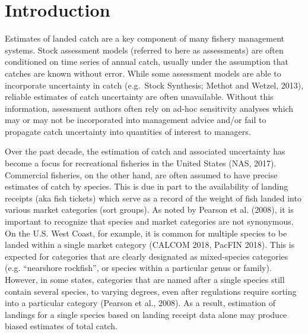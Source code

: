\documentclass[12pt]{article}
\begin{document}
%
\clearpage
\onehalfspacing
%

\section{Introduction}\label{introduction}

Estimates of landed catch are a key component of many fishery management
systems. Stock assessment models (referred to here as assessments) are
often conditioned on time series of annual catch, usually under the
assumption that catches are known without error. While some assessment
models are able to incorporate uncertainty in catch (e.g.~Stock
Synthesis; Methot and Wetzel, 2013), reliable estimates of catch
uncertainty are often unavailable. Without this information, assessment
authors often rely on ad-hoc sensitivity analyses which may or may not
be incorporated into management advice and/or fail to propagate catch
uncertainty into quantities of interest to managers.

Over the past decade, the estimation of catch and associated uncertainty
has become a focus for recreational fisheries in the United States (NAS,
2017). Commercial fisheries, on the other hand, are often assumed to
have precise estimates of catch by species. This is due in part to the
availability of landing receipts (aka fish tickets) which serve as a
record of the weight of fish landed into various market categories (sort
groups). As noted by Pearson et al. (2008), it is important to recognize
that species and market categories are not synonymous. On the U.S. West
Coast, for example, it is common for multiple species to be landed
within a single market category (CALCOM 2018, PacFIN 2018). This is
expected for categories that are clearly designated as mixed-species
categories (e.g. ``nearshore rockfish'', or species within a particular
genus or family). However, in some states, categories that are named
after a single species still contain several species, to varying
degrees, even after regulations require sorting into a particular
category (Pearson et al., 2008). As a result, estimation of landings for
a single species based on landing receipt data alone may produce biased
estimates of total catch.
\end{document}
